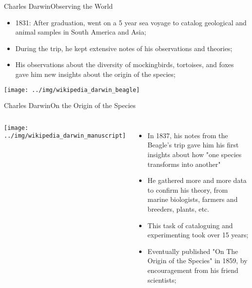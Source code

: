 \begin{frame}{Charles Darwin}{Observing the World}
  \begin{itemize}
    \item 1831: After graduation, went on a 5 year sea voyage to catalog geological and animal samples in South America and Asia;\medskip

    \item During the trip, he kept extensive notes of his observations and theories;\medskip

    \item His observations about the diversity of mockingbirds, tortoises, and foxes gave him new insights about the origin of the species;
  \end{itemize}\bigskip

  \begin{center}
    \texttt{[image: ../img/wikipedia\_darwin\_beagle]}
  \end{center}
\end{frame}

\begin{frame}{Charles Darwin}{On the Origin of the Species}
  \begin{columns}
    \texttt{[image: ../img/wikipedia\_darwin\_manuscript]}
  \begin{itemize}
    \item In 1837, his notes from the Beagle's trip gave him his first insights about how "one species transforms into another"
    \item He gathered more and more data to confirm his theory, from marine biologists, farmers and breeders, plants, etc.
    \item This task of cataloguing and experimenting took over 15 years;
    \item Eventually published "On The Origin of the Species" in 1859, by encouragement from his friend scientists;
  \end{itemize}
  \end{columns}
\end{frame}
